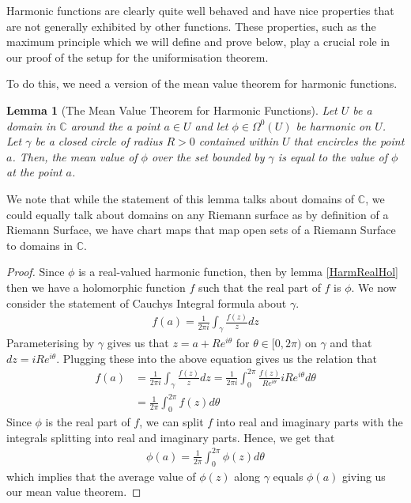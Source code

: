 \documentclass[a4paper,12pt]{report}
\theoremstyle{plain}
\newtheorem{lemma}[thm]{Lemma}
\theoremstyle{definition}
\begin{document}
Harmonic functions are clearly quite well behaved and have nice properties that are not generally exhibited by other functions. These properties, such as the maximum principle which we will define and prove below, play a crucial role in our proof of the setup for the uniformisation theorem.

To do this, we need a version of the mean value theorem for harmonic functions.
\begin{lemma}[The Mean Value Theorem for Harmonic Functions]\label{MVT}
  Let $U$ be a domain in $\mathbb{C}$ around the a point $a \in U$ and let $\phi \in \Omega^0(U)$ be harmonic on $U$. Let $\gamma$ be a closed circle of radius $R > 0$ contained within $U$ that encircles the point $a$. Then, the mean value of $\phi$ over the set bounded by $\gamma$ is equal to the value of $\phi$ at the point $a$. 
\end{lemma}
We note that while the statement of this lemma talks about domains of $\mathbb{C}$, we could equally talk about domains on any Riemann surface as by definition of a Riemann Surface, we have chart maps that map open sets of a Riemann Surface to domains in $\mathbb{C}$. 
\begin{proof}
  Since $\phi$ is a real-valued harmonic function, then by lemma \ref{HarmRealHol} then we have a holomorphic function $f$ such that the real part of $f$ is $\phi$. We now consider the statement of Cauchys Integral formula about $\gamma$.
  \begin{align*}
    f(a) = \frac{1}{2\pi i}\int_{\gamma}\frac{f(z)}{z}dz
  \end{align*}
  Parameterising by $\gamma$ gives us that $z= a + Re^{i\theta}$ for $\theta \in [0, 2\pi)$ on $\gamma$ and that $dz = iRe^{i\theta}$. Plugging these into the above equation gives us the relation that
  \begin{align*}
    f(a) &= \frac{1}{2\pi i}\int_{\gamma}\frac{f(z)}{z}dz = \frac{1}{2\pi i}\int_0^{2\pi}\frac{f(z)}{Re^{i\theta}}iRe^{i\theta}d\theta \\
    &= \frac{1}{2\pi}\int_0^{2\pi}f(z)d\theta
  \end{align*}
  Since $\phi$ is the real part of $f$, we can split $f$ into real and imaginary parts with the integrals splitting into real and imaginary parts. Hence, we get that 
  \begin{align*}
    \phi(a)=\frac{1}{2\pi}\int_0^{2\pi}\phi(z)d\theta
  \end{align*}
    which implies that the average value of $\phi(z)$ along $\gamma$ equals $\phi(a)$ giving us our mean value theorem.
\end{proof}
\end{document}
